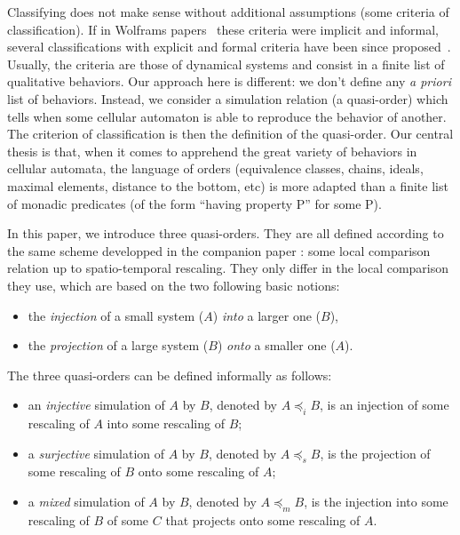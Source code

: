 \documentclass[a4paper]{elsarticle}
\newcommand{\simu}{\preccurlyeq}
\newcommand{\sacsimu}{\simu_i}
\newcommand{\facsimu}{\simu_s}
\newcommand{\facsacsimu}{\simu_m}
\begin{document}
Classifying does not make sense without additional assumptions (some
criteria of classification). If in Wolframs
papers~\cite{Wolfram:1984:CTCA} these criteria were implicit and
informal, several classifications with explicit and formal criteria
have been since
proposed~\cite{Gilman:1987:CLA,Cattaneo:1999:TDD,Kurka97}. Usually,
the criteria are those of dynamical systems and consist in a finite
list of qualitative behaviors. Our approach here is different: we
don't define any \textit{a priori} list of behaviors. Instead, we
consider a simulation relation (a quasi-order) which tells when some
cellular automaton is able to reproduce the behavior of another. The
criterion of classification is then the definition of the
quasi-order. Our central thesis is that, when it comes to apprehend
the great variety of behaviors in cellular automata, the language of
orders (equivalence classes, chains, ideals, maximal elements,
distance to the bottom, etc) is more adapted than a finite list of
monadic predicates (of the form ``having property P'' for some P).

In this paper, we introduce three quasi-orders. They are all defined
according to the same scheme developped in the companion paper
\cite{bulking1}: some local comparison relation up to spatio-temporal
rescaling. They only differ in the local comparison they use, which
are based on the two following basic notions:
\begin{itemize}
\item the \emph{injection} of a small system ($A$) \emph{into} a larger one ($B$),
\item the \emph{projection} of a large system ($B$) \emph{onto} a smaller one ($A$).
\end{itemize}

The three quasi-orders can be defined informally as follows:
\begin{itemize}
\item an \emph{injective} simulation of $A$ by $B$, denoted by $A
  \sacsimu B$, is an injection of some rescaling of $A$ into some
  rescaling of $B$;
\item a \emph{surjective} simulation of $A$ by $B$, denoted by $A
  \facsimu B$, is the projection of some rescaling of $B$ onto some
  rescaling of $A$;
\item a \emph{mixed} simulation of $A$ by $B$, denoted by $A
  \facsacsimu B$, is the injection into some rescaling of $B$ of some
  $C$ that projects onto some rescaling of $A$.
\end{itemize}
\end{document}
